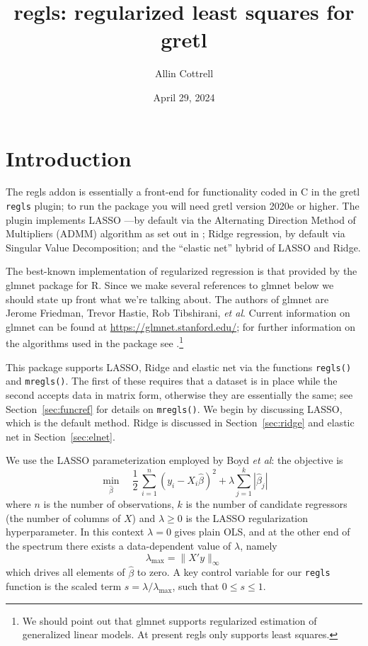 \documentclass{article}
\title{\textsf{regls}: regularized least squares for gretl}
\author{Allin Cottrell}
\date{April 29, 2024}
\begin{document}
\maketitle

\section{Introduction}
\label{sec:intro}

The \textsf{regls} addon is essentially a front-end for functionality
coded in C in the gretl \texttt{regls} plugin; to run the package you
will need gretl version 2020e or higher.  The plugin implements LASSO
\citep{tibshirani96}---by default via the Alternating Direction Method
of Multipliers (ADMM) algorithm as set out in \cite{boyd2010}; Ridge
regression, by default via Singular Value Decomposition; and the
``elastic net'' hybrid of LASSO and Ridge.

The best-known implementation of regularized regression is that
provided by the \textsf{glmnet} package for \textsf{R}. Since we make
several references to \textsf{glmnet} below we should state up front
what we're talking about. The authors of \textsf{glmnet} are Jerome
Friedman, Trevor Hastie, Rob Tibshirani, \textit{et al}.  Current
information on \textsf{glmnet} can be found at
\url{https://glmnet.stanford.edu/}; for further information on the
algorithms used in the package see \cite{glmnet10}.\footnote{We should
  point out that \textsf{glmnet} supports regularized estimation of
  generalized linear models. At present \textsf{regls} only supports
  least squares.}

This package supports LASSO, Ridge and elastic net via the functions
\texttt{regls()} and \texttt{mregls()}. The first of these requires
that a dataset is in place while the second accepts data in matrix
form, otherwise they are essentially the same; see
Section~\ref{sec:funcref} for details on \texttt{mregls()}.  We begin
by discussing LASSO, which is the default method.  Ridge is discussed
in Section~\ref{sec:ridge} and elastic net in Section~\ref{sec:elnet}.

We use the LASSO parameterization employed by Boyd \textit{et al}: the
objective is
\begin{equation}
  \label{eq:obj}
  \min_{\hat{\beta}} \quad \frac{1}{2}\,
  \sum_{i=1}^n (y_i - X_i\hat{\beta})^2 + \lambda \sum_{j=1}^k |\hat{\beta}_j|
\end{equation}
where $n$ is the number of observations, $k$ is the number of
candidate regressors (the number of columns of $X$) and
$\lambda \geq 0$ is the LASSO regularization hyperparameter. In this
context $\lambda = 0$ gives plain OLS, and at the other end of the
spectrum there exists a data-dependent value of $\lambda$, namely
\begin{equation}
  \label{eq:lmax}
  \lambda_{\max} = \|X'y\|_{\infty}
\end{equation}
which drives all elements of $\hat{\beta}$ to zero.  A key control
variable for our \texttt{regls} function is the scaled term
$s = \lambda/\lambda_{\max}$, such that $0 \leq s \leq 1$.
\end{document}
